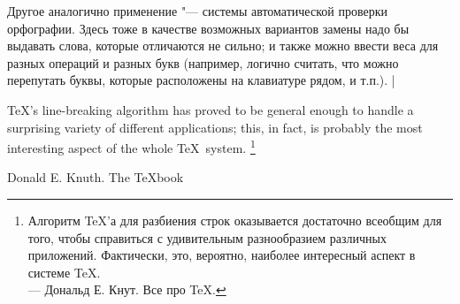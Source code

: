 Другое аналогично применение "--- системы автоматической проверки орфографии. Здесь тоже в качестве 
возможных вариантов замены надо бы выдавать слова, которые отличаются не сильно; и также можно 
ввести веса для разных операций и разных букв (например, логично считать, что можно перепутать 
буквы, которые расположены на клавиатуре рядом, и т.п.).
|

%

\epigraph{\rm\TeX's line-breaking algorithm
has proved to be general enough to handle a surprising variety of
different applications; this, in fact, is probably the most interesting
aspect of the whole \TeX\ system.%
\footnote{\raggedright Алгоритм \TeX'а для разбиения строк оказывается достаточно всеобщим для того, чтобы 
справиться с удивительным разнообразием различных приложений. Фактически, это, вероятно, наиболее 
интересный аспект в системе \TeX.\\
\hspace{0.3\textwidth}--- Дональд Е. Кнут. Все про \TeX.}
}{Donald E. Knuth. The \TeX book}


